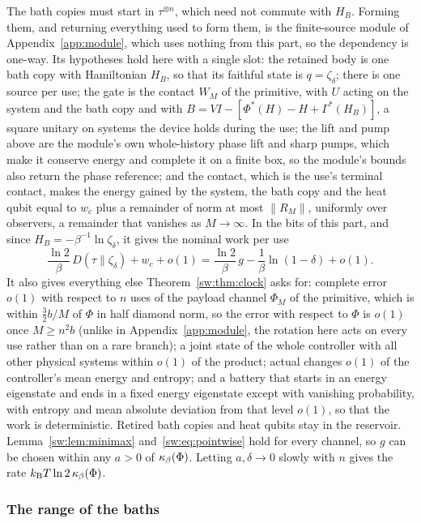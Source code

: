 The bath copies must start in $\tau^{\otimes n}$, which need not commute with $H_B$. Forming them, and returning everything used to form them, is the finite-source module of Appendix~\ref{app:module}, which uses nothing from this part, so the dependency is one-way. Its hypotheses hold here with a single slot: the retained body is one bath copy with Hamiltonian $H_B$, so that its faithful state is $q=\zeta_\delta$; there is one source per use; the gate is the contact $W_M$ of the primitive, with $U$ acting on the system and the bath copy and with $B=VI-[\Phi^*(H)-H+\Gamma^*(H_B)]$, a square unitary on systems the device holds during the use; the lift and pump above are the module's own whole-history phase lift and sharp pumps, which make it conserve energy and complete it on a finite box, so the module's bounds also return the phase reference; and the contact, which is the use's terminal contact, makes the energy gained by the system, the bath copy and the heat qubit equal to $w_c$ plus a remainder of norm at most $\|R_M\|$, uniformly over observers, a remainder that vanishes as $M\to\infty$. In the bits of this part, and since $H_B=-\beta^{-1}\ln\zeta_\delta$, it gives the nominal work per use
\[
\frac{\ln2}{\beta}\,D(\tau\|\zeta_\delta)+w_c+o(1)=\frac{\ln2}{\beta}\,g-\frac1\beta\ln(1-\delta)+o(1).
\]
It also gives everything else Theorem~\ref{sw:thm:clock} asks for: complete error $o(1)$ with respect to $n$ uses of the payload channel $\Phi_M$ of the primitive, which is within $\tfrac32b/M$ of $\Phi$ in half diamond norm, so the error with respect to $\Phi$ is $o(1)$ once $M\ge n^2b$ (unlike in Appendix~\ref{app:module}, the rotation here acts on every use rather than on a rare branch); a joint state of the whole controller with all other physical systems within $o(1)$ of the product; actual changes $o(1)$ of the controller's mean energy and entropy; and a battery that starts in an energy eigenstate and ends in a fixed energy eigenstate except with vanishing probability, with entropy and mean absolute deviation from that level $o(1)$, so that the work is deterministic. Retired bath copies and heat qubits stay in the reservoir. Lemma~\ref{sw:lem:minimax} and~\eqref{sw:eq:pointwise} hold for every channel, so $g$ can be chosen within any $a>0$ of $\kappa_\beta(\Phi)$. Letting $a,\delta\to0$ slowly with $n$ gives the rate $k_{\mathrm B} T\ln2\,\kappa_\beta(\Phi)$.

\subsubsection{The range of the baths}

